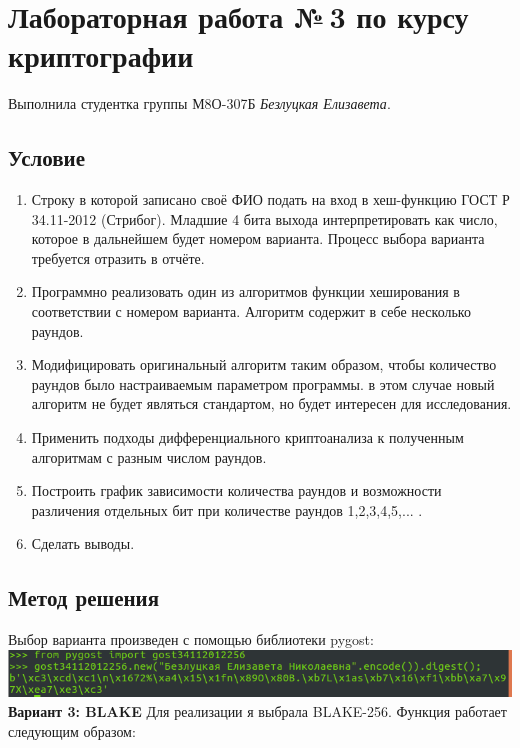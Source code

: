 \documentclass[12pt]{article}
\begin{document}
\section*{Лабораторная работа №\,3 по курсу криптографии}

Выполнила студентка группы М8О-307Б \textit{Безлуцкая Елизавета}.

\subsection*{Условие}
\begin{enumerate}
\item Строку в которой записано своё ФИО подать на вход в хеш-функцию ГОСТ Р 34.11-2012 (Стрибог). Младшие 4 бита выхода интерпретировать как число, которое в дальнейшем будет номером варианта. Процесс выбора варианта требуется отразить в отчёте.
\item Программно реализовать один из алгоритмов функции хеширования в соответствии с номером варианта. Алгоритм содержит в себе несколько раундов.
\item Модифицировать оригинальный алгоритм таким образом, чтобы количество раундов было настраиваемым параметром программы. в этом случае новый алгоритм не будет являться стандартом, но будет интересен для исследования.
\item Применить подходы дифференциального криптоанализа к полученным алгоритмам с разным числом раундов.
\item Построить график зависимости количества раундов и возможности различения отдельных бит при количестве раундов 1,2,3,4,5,... .
\item Сделать выводы.
\end{enumerate}

\subsection*{Метод решения}
Выбор варианта произведен с помощью библиотеки pygost:\\
\includegraphics[width=\linewidth]{images/var.png}\\

\textbf{Вариант 3: BLAKE}
Для реализации я выбрала BLAKE-256. Функция работает следующим образом:\\
\end{document}
